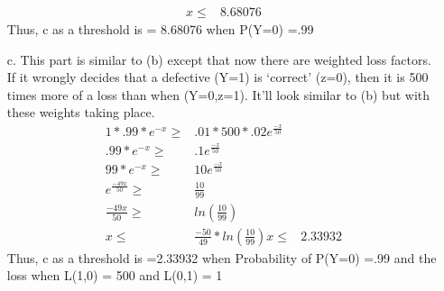 \documentclass{article}
\begin{document}
\begin{enumerate}
\begin{align*}
			x \leq& 8.68076
		\end{align*}
		Thus, c as a threshold is = 8.68076 when P(Y=0) =.99
	\item[c.] This part is similar to (b) except that now there are weighted loss factors. If it wrongly decides that a defective (Y=1) is `correct' (z=0), then it is 500 times more of a loss than
		when (Y=0,z=1). It'll look similar to (b) but with these weights taking place.
		\begin{align*}
			1 * .99 * e^{-x} \geq&  .01 * 500 * .02e^{\displaystyle \frac{-x}{50}} \\
			.99 * e^{-x} \geq& .1e^{\displaystyle \frac{-x}{50}} \\
			99 * e^{-x} \geq& 10e^{\displaystyle \frac{-x}{50}} \\
			e^{\displaystyle \frac{-49x}{50}} \geq& \frac{10}{99} \\
			\frac{-49x}{50} \geq& ln(\frac{10}{99}) \\
			x \leq& \frac{-50}{49} * ln(\frac{10}{99})
			x \leq& 2.33932
		\end{align*}
		Thus, c as a threshold is =2.33932 when Probability of P(Y=0) =.99 and the loss when L(1,0) = 500 and L(0,1) = 1
\end{enumerate}
\end{document}
